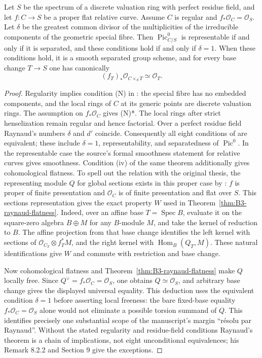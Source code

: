 \begin{theorem}\label{thm:B3-picard}
Let $S$ be the spectrum of a discrete valuation ring with perfect
residue field, and let $f:C\to S$ be a proper flat relative curve.
Assume $C$ is regular and $f_*\mathcal O_C=\mathcal O_S$.
Let $\delta$ be the greatest common divisor of the multiplicities
of the irreducible components of the geometric special fibre.
Then $\operatorname{Pic}^0_{C/S}$ is representable if and only if it
is separated, and these conditions hold if and only if $\delta=1$.
When these conditions hold, it is a smooth separated group scheme, and
for every base change $T\to S$ one has canonically
\[
 (f_T)_*\mathcal O_{C\times_S T}\simeq\mathcal O_T.
\]
\end{theorem}
\begin{proof}
Regularity implies condition (N) in
\cite[Definition 6.1.4 and Examples 6.1.6]{BRaynaud1970}: the
special fibre has no embedded components, and the local rings of
$C$ at its generic points are discrete valuation rings.
The assumption on $f_*\mathcal O_C$ gives (N)*.
The local rings after strict henselization remain regular and hence
factorial. Over a perfect residue field Raynaud's numbers $\delta$
and $d'$ coincide. Consequently all eight conditions of
\cite[Theorem 8.2.1, pp.~66--67]{BRaynaud1970} are equivalent;
these include $\delta=1$, representability, and separatedness of
$\operatorname{Pic}^0$. In the representable case the source's
formal smoothness statement for relative curves gives smoothness.
Condition (iv) of the same theorem additionally gives cohomological
flatness. To spell out the relation with the original thesis, the
representing module $Q$ for global sections exists in this proper case
by \cite[\S1.4, pp.~28--29]{BRaynaud1970}: $f$ is proper of finite
presentation and $\mathcal O_C$ is of finite presentation and flat over
$S$. This sections representation gives the exact property $W$ used in
Theorem~\ref{thm:B3-raynaud-flatness}. Indeed, over an affine base
$T=\operatorname{Spec}B$, evaluate it on the square-zero algebra
$B\oplus M$ for any $B$-module $M$, and take the kernel of reduction to
$B$. The affine projection from that base change identifies the left
kernel with sections of $\mathcal O_{C_T}\otimes f_T^*M$, and the right
kernel with $\operatorname{Hom}_B(Q_T,M)$. These natural identifications
give $W$ and commute with restriction and base change.

Now cohomological flatness and
Theorem~\ref{thm:B3-raynaud-flatness} make $Q$ locally free.
Since $Q^\vee=f_*\mathcal O_C=\mathcal O_S$, one obtains
$Q\simeq\mathcal O_S$, and arbitrary base change gives the displayed
universal equality. This deduction uses the equivalent condition
$\delta=1$ before asserting local freeness: the bare fixed-base equality
$f_*\mathcal O_C=\mathcal O_S$ alone would not eliminate a possible
torsion summand of $Q$.
This identifies precisely one substantial scope of the manuscript's
margin ``r\'esolu par Raynaud''. Without the stated regularity and
residue-field conditions Raynaud's theorem is a chain of implications,
not eight unconditional equivalences; his Remark 8.2.2 and Section 9
give the exceptions.
\end{proof}

